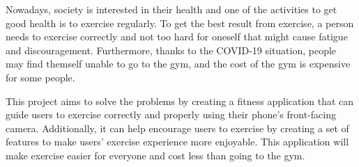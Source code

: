 Nowadays, society is interested in their health and one of the activities to get good health is to exercise regularly. To get the best result from exercise, a person needs to exercise correctly and not too hard for oneself that might cause fatigue and discouragement. Furthermore, thanks to the COVID-19 situation, people may find themself unable to go to the gym, and the cost of the gym is expensive for some people.
\par
This project aims to solve the problems by creating a fitness application that can guide users to exercise correctly and properly using their phone's front-facing camera. Additionally, it can help encourage users to exercise by creating a set of features to make users' exercise experience more enjoyable. This application will make exercise easier for everyone and cost less than going to the gym.
